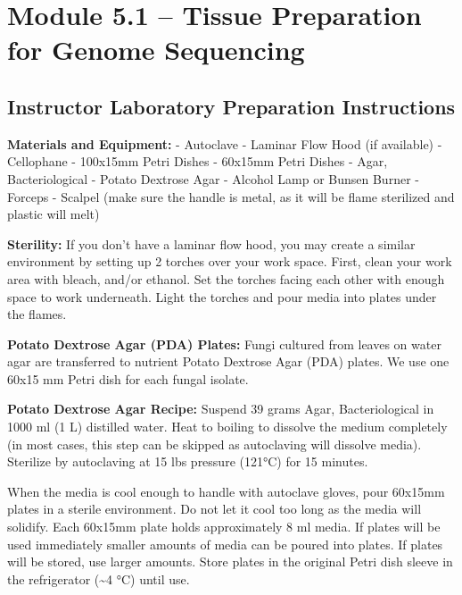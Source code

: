 \documentclass[
  letterpaper,
  DIV=11,
  numbers=noendperiod]{scrreprt}
\begin{document}

\section*{Module 5.1 -- Tissue Preparation for Genome
Sequencing}\label{module-5.1-tissue-preparation-for-genome-sequencing}


\subsection*{Instructor Laboratory Preparation
Instructions}\label{instructor-laboratory-preparation-instructions-4}

\textbf{Materials and Equipment:} - Autoclave - Laminar Flow Hood (if
available) - Cellophane - 100x15mm Petri Dishes - 60x15mm Petri Dishes -
Agar, Bacteriological - Potato Dextrose Agar - Alcohol Lamp or Bunsen
Burner - Forceps - Scalpel (make sure the handle is metal, as it will be
flame sterilized and plastic will melt)

\textbf{Sterility:} If you don't have a laminar flow hood, you may
create a similar environment by setting up 2 torches over your work
space. First, clean your work area with bleach, and/or ethanol. Set the
torches facing each other with enough space to work underneath. Light
the torches and pour media into plates under the flames.

\textbf{Potato Dextrose Agar (PDA) Plates:} Fungi cultured from leaves
on water agar are transferred to nutrient Potato Dextrose Agar (PDA)
plates. We use one 60x15 mm Petri dish for each fungal isolate.

\textbf{Potato Dextrose Agar Recipe:} Suspend 39 grams Agar,
Bacteriological in 1000 ml (1 L) distilled water. Heat to boiling to
dissolve the medium completely (in most cases, this step can be skipped
as autoclaving will dissolve media). Sterilize by autoclaving at 15 lbs
pressure (121°C) for 15 minutes.

When the media is cool enough to handle with autoclave gloves, pour
60x15mm plates in a sterile environment. Do not let it cool too long as
the media will solidify. Each 60x15mm plate holds approximately 8 ml
media. If plates will be used immediately smaller amounts of media can
be poured into plates. If plates will be stored, use larger amounts.
Store plates in the original Petri dish sleeve in the refrigerator
(\textasciitilde4 °C) until use.
\end{document}
